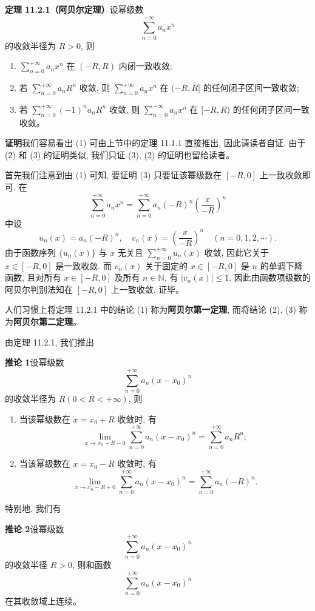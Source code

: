 \documentclass[UTF8,12pt,a4paper,fontset=fandol]{ctexart}
\begin{document}
\noindent\textbf{定理 11.2.1（阿贝尔定理）}\quad 设幂级数
\[
  \sum_{n=0}^{+\infty}a_nx^n
\]
的收敛半径为 $R>0$, 则
\begin{enumerate}
  \item $\sum_{n=0}^{+\infty}a_nx^n$ 在 $(-R,R)$ 内闭一致收敛;
  \item 若 $\sum_{n=0}^{+\infty}a_nR^n$ 收敛, 则 $\sum_{n=0}^{+\infty}a_nx^n$ 在 $(-R,R]$ 的任何闭子区间一致收敛;
  \item 若 $\sum_{n=0}^{+\infty}(-1)^na_nR^n$ 收敛, 则 $\sum_{n=0}^{+\infty}a_nx^n$ 在 $[-R,R)$ 的任何闭子区间一致收敛。
\end{enumerate}

\noindent\textbf{证明}\quad 我们容易看出 (1) 可由上节中的定理 11.1.1 直接推出, 因此请读者自证. 由于 (2) 和 (3) 的证明类似, 我们只证 (3), (2) 的证明也留给读者。

首先我们注意到由 (1) 可知, 要证明 (3) 只要证该幂级数在 $[-R,0]$ 上一致收敛即可. 在
\[
  \sum_{n=0}^{+\infty}a_nx^n
  =
  \sum_{n=0}^{+\infty}a_n(-R)^n\left(\frac{x}{-R}\right)^n
\]
中设
\[
  u_n(x)=a_n(-R)^n,\quad
  v_n(x)=\left(\frac{x}{-R}\right)^n
  \quad(n=0,1,2,\cdots).
\]
由于函数序列 $\{u_n(x)\}$ 与 $x$ 无关且 $\sum_{n=0}^{+\infty}u_n(x)$ 收敛, 因此它关于 $x\in[-R,0]$ 是一致收敛. 而 $v_n(x)$ 关于固定的 $x\in[-R,0]$ 是 $n$ 的单调下降函数, 且对所有 $x\in[-R,0]$ 及所有 $n\in\mathbb N$, 有 $|v_n(x)|\leqslant1$. 因此由函数项级数的阿贝尔判别法知在 $[-R,0]$ 上一致收敛. 证毕。

人们习惯上将定理 11.2.1 中的结论 (1) 称为\textbf{阿贝尔第一定理}, 而将结论 (2), (3) 称为\textbf{阿贝尔第二定理}。

由定理 11.2.1, 我们推出

\noindent\textbf{推论 1}\quad 设幂级数
\[
  \sum_{n=0}^{+\infty}a_n(x-x_0)^n
\]
的收敛半径为 $R(0<R<+\infty)$, 则
\begin{enumerate}
  \item 当该幂级数在 $x=x_0+R$ 收敛时, 有
  \[
    \lim_{x\to x_0+R-0}
    \sum_{n=0}^{+\infty}a_n(x-x_0)^n
    =
    \sum_{n=0}^{+\infty}a_nR^n;
  \]
  \item 当该幂级数在 $x=x_0-R$ 收敛时, 有
  \[
    \lim_{x\to x_0-R+0}
    \sum_{n=0}^{+\infty}a_n(x-x_0)^n
    =
    \sum_{n=0}^{+\infty}a_n(-R)^n.
  \]
\end{enumerate}
特别地, 我们有

\noindent\textbf{推论 2}\quad 设幂级数
\[
  \sum_{n=0}^{+\infty}a_n(x-x_0)^n
\]
的收敛半径 $R>0$, 则和函数
\[
  \sum_{n=0}^{+\infty}a_n(x-x_0)^n
\]
在其收敛域上连续。
\end{document}
